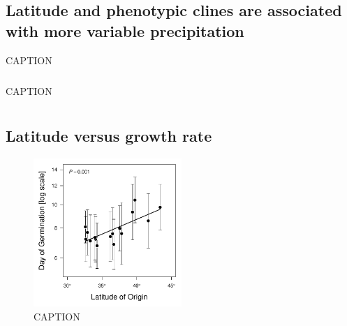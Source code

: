 \documentclass[11pt, oneside]{article}\usepackage[]{graphicx}\usepackage[]{color}
\begin{document}
\subsection*{Latitude and phenotypic clines are associated with more variable precipitation}

\begin{table}[htbp]
	\fontsize{10}{12}
	\selectfont
	\caption[ANOVA table, leaf expansion rate]{CAPTION}
	\begin{center}
	\begin{tabular}{lcccccc}
	\toprule

	

	\bottomrule
	\end{tabular}
	\end{center}
\end{table}

\begin{table}[htbp]
	\fontsize{10}{12}
	\selectfont
	\caption[ANOVA table, stem expansion rate]{CAPTION}
	\begin{center}
	\begin{tabular}{lcccccc}
	\toprule

	

	\bottomrule
	\end{tabular}
	\end{center}
\end{table}

\subsection*{Latitude versus growth rate}

\begin{figure}[h!]
	\centerline{\includegraphics[width=0.5\textwidth]{Figures/Figure_DoG_Lat.pdf}}
	\fontsize{10}{12}
	\selectfont
	\caption[Southern populations germinate sooner.]{CAPTION}
	\label{fig:Fig_DoG}
\end{figure}
\end{document}
